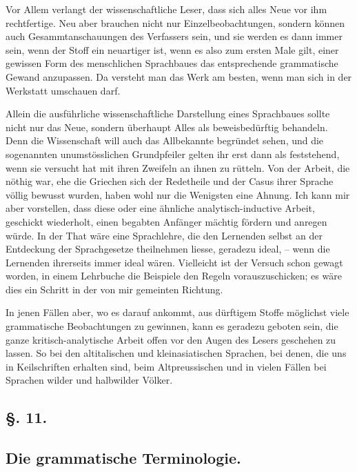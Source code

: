 Vor Allem verlangt der wissenschaftliche Leser, dass sich alles Neue vor ihm rechtfertige. Neu aber brauchen nicht nur Einzelbeobachtungen, sondern können auch Gesammtanschauungen des Verfassers sein, und sie werden es dann immer sein, wenn der Stoff ein neuartiger ist, wenn es also zum ersten Male gilt, einer gewissen Form des menschlichen Sprachbaues das entsprechende \label{sp.114} grammatische Gewand anzupassen. Da versteht man das Werk am besten, wenn man sich in der Werkstatt umschauen darf.

Allein die ausführliche wissenschaftliche Darstellung eines Sprachbaues sollte nicht nur das Neue, sondern überhaupt Alles als beweisbedürftig behandeln. Denn die Wissenschaft will auch das Allbekannte begründet sehen, und die sogenannten unumstösslichen Grundpfeiler gelten ihr erst dann als feststehend, wenn sie versucht hat mit ihren Zweifeln an ihnen zu rütteln. Von der Arbeit, die nöthig war, ehe die Griechen sich der Redetheile und der Casus ihrer Sprache völlig bewusst wurden, haben wohl nur die Wenigsten eine Ahnung. Ich kann mir aber vorstellen, dass diese oder eine ähnliche analytisch-inductive Arbeit, geschickt \label{fp.120} wiederholt, einen begabten Anfänger mächtig fördern und anregen würde. In der That wäre eine Sprachlehre, die den Lernenden selbst an der Entdeckung der Sprachgesetze theilnehmen liesse, geradezu ideal, – wenn die Lernenden ihrerseits immer ideal wären. Vielleicht ist der Versuch schon gewagt worden, in einem Lehrbuche die Beispiele den Regeln vorauszuschicken; es wäre dies ein Schritt in der von mir gemeinten Richtung.

In jenen Fällen aber, wo es darauf ankommt, aus dürftigem Stoffe möglichst viele grammatische Beobachtungen zu gewinnen, kann es geradezu geboten sein, die ganze kritisch-analytische Arbeit offen vor den Augen des Lesers geschehen zu lassen. So bei den altitalischen und kleinasiatischen Sprachen, bei denen, die uns in Keilschriften erhalten sind, beim Altpreussischen und in vielen Fällen bei Sprachen wilder und halbwilder Völker.

\subsection*{§. 11.}\label{II.VI.11}
\subsection*{Die grammatische Terminologie.}

